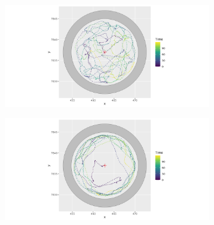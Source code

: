 \documentclass[11pt]{article}
\newcommand {\1}{\mathbb{1}}
\theoremstyle{definition}
\theoremstyle{remark}
\theoremstyle{remark}
\begin{document}
 \begin{figure}[H]
 	\centering
 	\begin{subfigure}{0.48\textwidth}
 		\centering
 		\includegraphics[scale=0.35]{images/crcvm/illustrative_sample_circ_standard}
 		\label{fig:illustrativesamplecircstandard}
 	\end{subfigure}
 	\begin{subfigure}{0.48\textwidth}
 		\centering
 		\includegraphics[scale=0.35]{images/crcvm/illustrative_sample_circ_pers}
 		\label{fig:illustrativesamplecircpers}
 	\end{subfigure}
 	

\end{figure}
\end{document}
